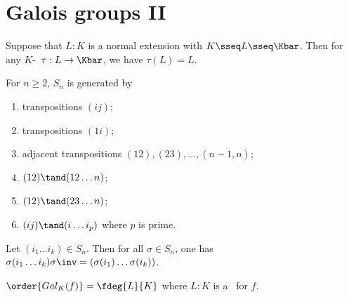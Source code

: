 \documentclass[a4paper]{article}
\begin{document}
\section{Galois groups II}
\begin{tlemma}
  Suppose that $ L:K $ is a normal extension with $ K\sseq L\sseq \Kbar $.
  Then for any $ K $-\homo~$ \tau:L\to \Kbar $, we have $ \tau(L) = L $.
\end{tlemma}

\begin{tlemma}
  For \( n\geq 2 \), \( S_n \) is generated by \begin{enumerate}
    \item transpositions \( (ij) \);
    \item transpositions \( (1i) \);
    \item adjacent transpositions \( (12),(23),\ldots,(n-1, n) \);
    \item \( (12)\tand (12\ldots n) \);
    \item \( (12)\tand (23\ldots n) \);
    \item \( (ij)\tand (i\ldots i_p) \) where \( p \) is prime.
  \end{enumerate}
\end{tlemma}

\begin{tlemma}
  Let \( (i_1\ldots i_k)\in S_n \).
  Then for all \( \sigma\in S_n \), one has \( \sigma(i_1\ldots i_k)\sigma\inv = (\sigma(i_1)\ldots\sigma(i_k)) \).
\end{tlemma}

\quad \( \order{Gal_K(f)} = \fdeg{L}{K} \) where \( L:K \) is a \sfe~for \( f \).
\end{document}
